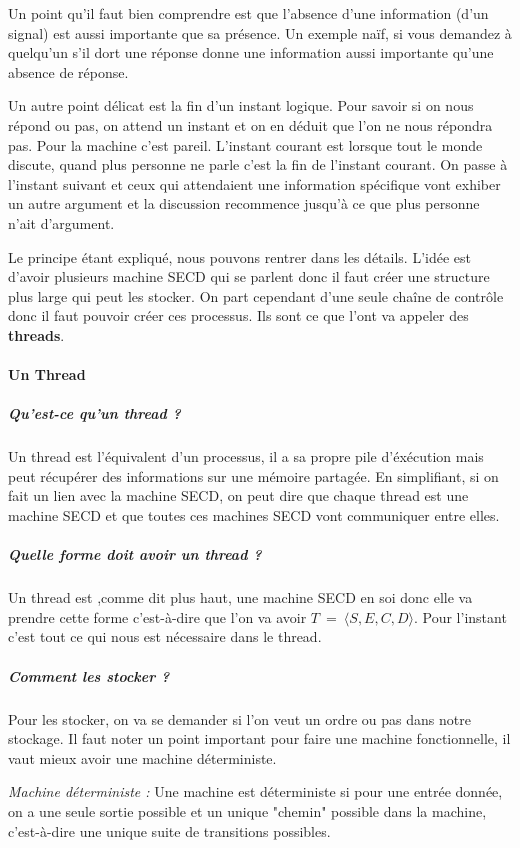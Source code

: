 \documentclass[10pt,a4paper]{article}
\begin{document}
				Un point qu'il faut bien comprendre est que l'absence d'une information (d'un signal) est aussi importante que sa présence. Un exemple naïf, si vous demandez à quelqu'un s'il dort une réponse donne une information aussi importante qu'une absence de réponse.
				\medbreak
				
				Un autre point délicat est la fin d'un instant logique. Pour savoir si on nous répond ou pas, on attend un instant et on en déduit que l'on ne nous répondra pas. Pour la machine c'est pareil. L'instant courant est lorsque tout le monde discute, quand plus personne ne parle c'est la fin de l'instant courant. On passe à l'instant suivant et ceux qui attendaient une information spécifique vont exhiber un autre argument et la discussion recommence jusqu'à ce que plus personne n'ait d'argument.
				\medbreak
				
				Le principe étant expliqué, nous pouvons rentrer dans les détails. L'idée est d'avoir plusieurs machine SECD qui se parlent donc il faut créer une structure plus large qui peut les stocker. On part cependant d'une seule chaîne de contrôle donc il faut pouvoir créer ces processus. Ils sont ce que l'ont va appeler des \textbf{threads}.
				\bigbreak
				
				
				\paragraph{Un Thread}
						
					\subparagraph{Qu'est-ce qu'un thread ?}
					Un thread est l'équivalent d'un processus, il a sa propre pile d'éxécution mais peut récupérer des informations sur une mémoire partagée. En simplifiant, si on fait un lien avec la machine SECD, on peut dire que chaque thread est une machine SECD et que toutes ces machines SECD vont communiquer entre elles.
						
					\subparagraph{Quelle forme doit avoir un thread ?} 
					Un thread est ,comme dit plus haut, une machine SECD en soi donc elle va prendre cette forme c'est-à-dire que l'on va avoir $T~=~\langle S,E,C,D\rangle$. Pour l'instant c'est tout ce qui nous est nécessaire dans le thread.
						
					\subparagraph{Comment les stocker ?}
					Pour les stocker, on va se demander si l'on veut un ordre ou pas dans notre stockage. Il faut noter un point important pour faire une machine fonctionnelle, il vaut mieux avoir une machine déterministe.
					\medbreak
						
					\textit{Machine déterministe :} Une machine est déterministe si pour une entrée donnée, on a une seule sortie possible et un unique "chemin" possible dans la machine, c'est-à-dire une unique suite de transitions possibles.
					\medbreak
						
\end{document}
